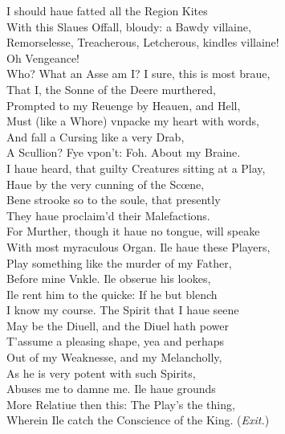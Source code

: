 \documentclass[a5paper,DIV=calc,11pt]{scrbook}
\begin{document}
\begin{drama*}
    I should haue fatted all the Region Kites\\
    With this Slaues Offall, bloudy: a Bawdy villaine,\\
    Remorselesse, Treacherous, Letcherous, kindles villaine!\\
    Oh Vengeance!\\
    Who? What an Asse am I? I sure, this is most braue,\\
    That I, the Sonne of the Deere murthered,\\
    Prompted to my Reuenge by Heauen, and Hell,\\
    Must (like a Whore) vnpacke my heart with words,\\
    And fall a Cursing like a very Drab,\\
    A Scullion? Fye vpon't: Foh. About my Braine.\\
    I haue heard, that guilty Creatures sitting at a Play,\\
    Haue by the very cunning of the Scœne,\\
    Bene strooke so to the soule, that presently\\
    They haue proclaim'd their Malefactions.\\
    For Murther, though it haue no tongue, will speake\\
    With most myraculous Organ. Ile haue these Players,\\
    Play something like the murder of my Father,\\
    Before mine Vnkle. Ile obserue his lookes,\\
    Ile rent him to the quicke: If he but blench\\
    I know my course. The Spirit that I haue seene\\
    May be the Diuell, and the Diuel hath power\\
    T'assume a pleasing shape, yea and perhaps\\
    Out of my Weaknesse, and my Melancholly,\\
    As he is very potent with such Spirits,\\
    Abuses me to damne me. Ile haue grounds\\
    More Relatiue then this: The Play's the thing,\\
    Wherein Ile catch the Conscience of the King. \hfill(\textit{Exit.})
\end{drama*}

\act

\scene
\end{document}
